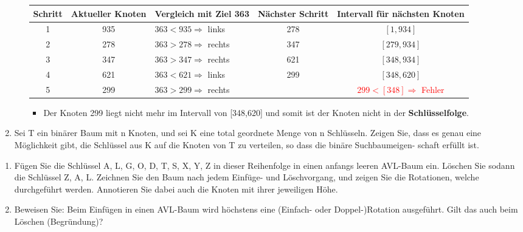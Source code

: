 \documentclass[a4paper]{assignment}
\begin{document}
\begin{problemlist}
\begin{enumerate}
\begin{enumerate}
\begin{answer}
\begin{center}
\small
\hspace*{-3cm}
\begin{tabular}{@{} c c l c c @{}}
\toprule
\textbf{Schritt} & \textbf{Aktueller Knoten} & \textbf{Vergleich mit Ziel 363} & \textbf{Nächster Schritt} & \textbf{Intervall für nächsten Knoten} \\
\midrule
1 & 935 & \( 363 < 935 \Rightarrow \) links & 278 & \([1, 934]\) \\
2 & 278 & \( 363 > 278 \Rightarrow \) rechts & 347 & \([279, 934]\) \\
3 & 347 & \( 363 > 347 \Rightarrow \) rechts & 621 & \([348, 934]\) \\
4 & 621 & \( 363 < 621 \Rightarrow \) links & 299 & \([348, 620]\) \\
5 & 299 & \( 363 > 299 \Rightarrow \) rechts & & \textcolor{red}{\( 299 < [348] \Rightarrow \) Fehler} \\
\bottomrule
\end{tabular}
\end{center}

\begin{itemize}
	\item Der Knoten 299 liegt nicht mehr im Intervall von [348,620] und somit ist der Knoten nicht in der \textbf{Schlüsselfolge}.
\end{itemize}

\end{answer}

\end{enumerate}

\item Sei T ein binärer Baum mit n Knoten, und sei K eine total geordnete Menge
von n Schlüsseln. Zeigen Sie, dass es genau eine Möglichkeit gibt, die Schlüssel
aus K auf die Knoten von T zu verteilen, so dass die binäre Suchbaumeigen-
schaft erfüllt ist.
\end{enumerate}


\begin{enumerate}
\item Fügen Sie die Schlüssel A, L, G, O, D, T, S, X, Y, Z in dieser Reihenfolge in
einen anfangs leeren AVL-Baum ein. Löschen Sie sodann die Schlüssel Z, A,
L. Zeichnen Sie den Baum nach jedem Einfüge- und Löschvorgang, und zeigen
Sie die Rotationen, welche durchgeführt werden. Annotieren Sie dabei auch
die Knoten mit ihrer jeweiligen Höhe.

\item Beweisen Sie: Beim Einfügen in einen AVL-Baum wird höchstens eine (Einfach-
oder Doppel-)Rotation ausgeführt. Gilt das auch beim Löschen (Begründung)?
\end{enumerate}


	
	
	
\end{problemlist}

\end{document}
